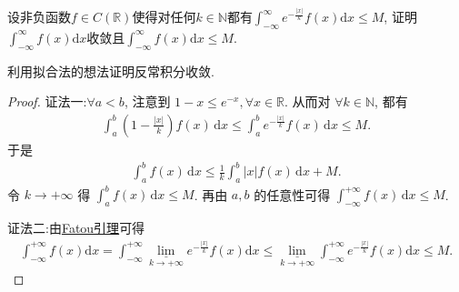 \documentclass[../../main.tex]{subfiles}
\begin{document}
\begin{example}
设非负函数$f \in C(\mathbb{R})$使得对任何$k \in \mathbb{N}$都有$\int_{-\infty}^{\infty} e^{-\frac{|x|}{k}} f(x) \mathrm{d}x \leqslant M$, 证明$\int_{-\infty}^{\infty} f(x) \mathrm{d}x$收敛且$\int_{-\infty}^{\infty} f(x) \mathrm{d}x \leqslant M$.
\end{example}
\begin{note}
利用拟合法的想法证明反常积分收敛.
\end{note}
\begin{proof}
{\color{blue} 证法一:}$\forall a < b$, 注意到 $1 - x \leqslant e^{-x}, \forall x \in \mathbb{R}$. 从而对 $\forall k \in \mathbb{N}$, 都有
\begin{align*}
\int_a^b \left( 1 - \frac{|x|}{k} \right) f(x) \, \mathrm{d}x \leqslant \int_a^b e^{-\frac{|x|}{k}} f(x) \, \mathrm{d}x \leqslant M.
\end{align*}
于是
\begin{align*}
\int_a^b f(x) \, \mathrm{d}x \leqslant \frac{1}{k} \int_a^b |x| f(x) \, \mathrm{d}x + M.
\end{align*}
令 $k \to +\infty$ 得 $\int_a^b f(x) \, \mathrm{d}x \leqslant M$. 再由 $a, b$ 的任意性可得 $\int_{-\infty}^{+\infty} f(x) \, \mathrm{d}x \leqslant M$.

{\color{blue} 证法二:}由\hyperref[Real Analysis-lemma:Fatou引理]{Fatou引理}可得
\begin{align*}
\int_{-\infty}^{+\infty}{f\left( x \right) \mathrm{d}x}=\int_{-\infty}^{+\infty}{\underset{k\rightarrow +\infty}{\underline{\lim }}e^{-\frac{\left| x \right|}{k}}f\left( x \right) \mathrm{d}x}\leqslant \underset{k\rightarrow +\infty}{\underline{\lim }}\int_{-\infty}^{+\infty}{e^{-\frac{\left| x \right|}{k}}f\left( x \right) \mathrm{d}x}\leqslant M.
\end{align*}

\end{proof}
\end{document}
